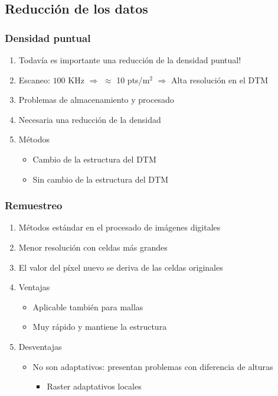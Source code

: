 \subsection{Reducción de los datos}
\begin{frame}
  \frametitle{Densidad puntual}
  \begin{enumerate}
    \item \alert{Todavía} es importante una reducción de la densidad
      puntual\alert{!}
    \item Escaneo: $100$ KHz $\Rightarrow$ \alert{$\approx$ 10
      pts/$\mathrm{m}^2$} $\Rightarrow$ Alta resolución en el DTM
    \item Problemas de almacenamiento y procesado
    \item Necesaria una reducción de la densidad
    \item Métodos
      \begin{itemize}
        \item Cambio de la estructura del DTM
        \item Sin cambio de la estructura del DTM
      \end{itemize}
  \end{enumerate}
\end{frame}
\begin{frame}
  \frametitle{Remuestreo}
  \begin{enumerate}
    \item Métodos estándar en el procesado de imágenes digitales
    \item Menor resolución con celdas más grandes
    \item El valor del píxel nuevo se deriva de las celdas originales
    \item<2-> \alert<2>{Ventajas}
      \begin{itemize}
        \item Aplicable también para mallas
        \item Muy rápido y mantiene la estructura
      \end{itemize}
    \item<3-> \alert<3->{Desventajas}
      \begin{itemize}
        \item No son adaptativos: presentan problemas con diferencia de alturas
         \begin{itemize}
           \item<4-> Raster adaptativos locales
         \end{itemize}
      \end{itemize}
  \end{enumerate}
\end{frame}
